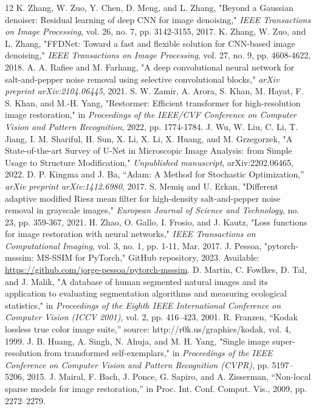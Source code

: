 \begin{thebibliography}{12}
     K. Zhang, W. Zuo, Y. Chen, D. Meng, and L. Zhang, "Beyond a Gaussian denoiser: Residual learning of deep CNN for image denoising," \textit{IEEE Transactions on Image Processing}, vol. 26, no. 7, pp. 3142-3155, 2017.
     K. Zhang, W. Zuo, and L. Zhang, "FFDNet: Toward a fast and flexible solution for CNN-based image denoising," \textit{IEEE Transactions on Image Processing}, vol. 27, no. 9, pp. 4608-4622, 2018.
     A. A. Rafiee and M. Farhang, "A deep convolutional neural network for salt-and-pepper noise removal using selective convolutional blocks," \textit{arXiv preprint arXiv:2104.06445}, 2021.
     S. W. Zamir, A. Arora, S. Khan, M. Hayat, F. S. Khan, and M.-H. Yang, "Restormer: Efficient transformer for high-resolution image restoration," in \textit{Proceedings of the IEEE/CVF Conference on Computer Vision and Pattern Recognition}, 2022, pp. 1774-1784.
     J. Wu, W. Liu, C. Li, T. Jiang, I. M. Shariful, H. Sun, X. Li, X. Li, X. Huang, and M. Grzegorzek, "A State-of-the-art Survey of U-Net in Microscopic Image Analysis: from Simple Usage to Structure Modification," \textit{Unpublished manuscript}, arXiv:2202.06465, 2022.
     D. P. Kingma and J. Ba, “Adam: A Method for Stochastic Optimization,” \textit{arXiv preprint arXiv:1412.6980}, 2017.
     S. Memiş and U. Erkan, "Different adaptive modified Riesz mean filter for high-density salt-and-pepper noise removal in grayscale images," \textit{European Journal of Science and Technology}, no. 23, pp. 359-367, 2021.
     H. Zhao, O. Gallo, I. Frosio, and J. Kautz, "Loss functions for image restoration with neural networks," \textit{IEEE Transactions on Computational Imaging}, vol. 3, no. 1, pp. 1-11, Mar. 2017.
     J. Pessoa, "pytorch-msssim: MS-SSIM for PyTorch," GitHub repository, 2023. Available: \url{https://github.com/jorge-pessoa/pytorch-msssim}.
     D. Martin, C. Fowlkes, D. Tal, and J. Malik, "A database of human segmented natural images and its application to evaluating segmentation algorithms and measuring ecological statistics," in \textit{Proceedings of the Eighth IEEE International Conference on Computer Vision (ICCV 2001)}, vol. 2, pp. 416–423, 2001.
     R. Franzen, “Kodak lossless true color image suite,” source: http://r0k.us/graphics/kodak, vol. 4, 1999.
     J. B. Huang, A. Singh, N. Ahuja, and M. H. Yang, "Single image super-resolution from transformed self-exemplars," in \textit{Proceedings of the IEEE Conference on Computer Vision and Pattern Recognition (CVPR)}, pp. 5197–5206, 2015.
     J. Mairal, F. Bach, J. Ponce, G. Sapiro, and A. Zisserman, “Non-local sparse models for image restoration,” in Proc. Int. Conf. Comput. Vis., 2009, pp. 2272–2279.
\end{thebibliography}